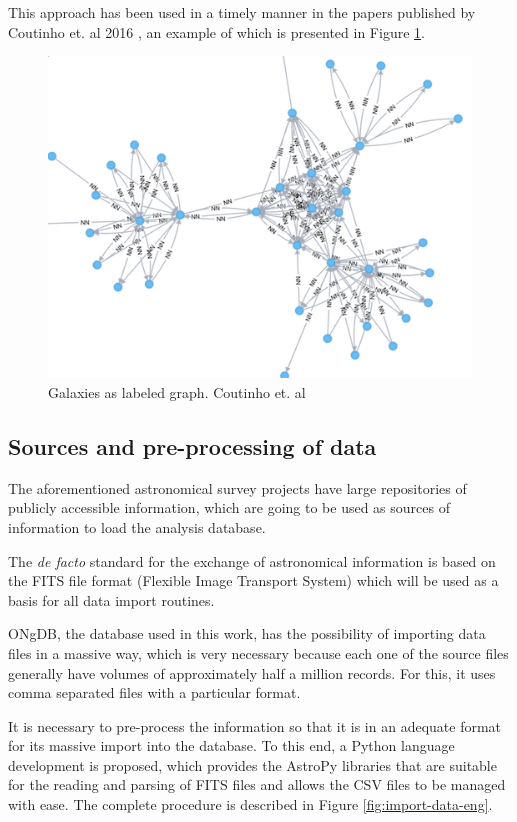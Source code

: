 	This approach has been used in a timely manner in the papers published by Coutinho et. al 2016 \cite{coutinho2016network}, an example of which is presented in Figure \ref{fig:galaxies-as-graph-eng}.
	
	\begin{figure}[h]
		\centering
		\includegraphics[width=0.7\linewidth]{./images/galaxies-graph-visualization-small}
		\caption{Galaxies as labeled graph. Coutinho et. al}
		\label{fig:galaxies-as-graph-eng}
	\end{figure}
	
	\subsection{Sources and pre-processing of data} \label{sec:sources-preprocessing}
	
	The aforementioned astronomical survey projects have large repositories of publicly accessible information, which are going to be used as sources of information to load the analysis database.
	
	The \emph{de facto} standard for the exchange of astronomical information is based on the FITS file format (Flexible Image Transport System\cite{hanisch2001definition}) which will be used as a basis for all data import routines.
	
	ONgDB, the database used in this work, has the possibility of importing data files in a massive way, which is very necessary because each one of the source files generally have volumes of approximately half a million records. For this, it uses comma separated files with a particular format.
	
	It is necessary to pre-process the information so that it is in an adequate format for its massive import into the database. To this end, a Python language development is proposed, which provides the AstroPy \cite{robitaille2013astropy} libraries that are suitable for the reading and parsing of FITS files and allows the CSV files to be managed with ease. The complete procedure is described in Figure \ref{fig:import-data-eng}.
	
